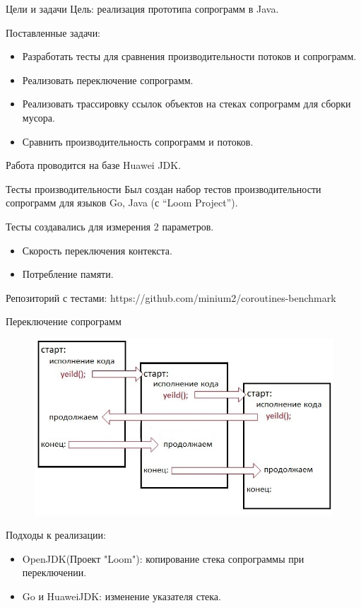 \begin{frame}{Цели и задачи}
	Цель: реализация прототипа сопрограмм в Java.
	\par
	Поставленные задачи:
	\begin{itemize}
		\item Разработать тесты для сравнения производительности потоков и сопрограмм.
		\item Реализовать переключение сопрограмм.
		\item Реализовать трассировку ссылок объектов на стеках сопрограмм для сборки мусора.
		\item Сравнить производительность сопрограмм и потоков. 
	\end{itemize}
	Работа проводится на базе Huawei JDK.
\end{frame}

\begin{frame}{Тесты производительности}
	Был создан набор тестов производительности сопрограмм для языков Go, Java (с “Loom Project”).
	
	Тесты создавались для измерения 2 параметров.
	\begin{itemize}
		\item Скорость переключения контекста.
		\item Потребление памяти.
	\end{itemize}
	Репозиторий с тестами: https://github.com/minium2/coroutines-benchmark
\end{frame}

\begin{frame}{Переключение сопрограмм}
	\begin{figure}
		\includegraphics[scale=0.5]{images/scheme.jpg}
	\end{figure}
	\par
	Подходы к реализации:
	\begin{itemize}
		\item OpenJDK(Проект "Loom"): копирование стека сопрограммы при переключении.
		\item Go и HuaweiJDK: изменение указателя стека.
	\end{itemize}
\end{frame}


